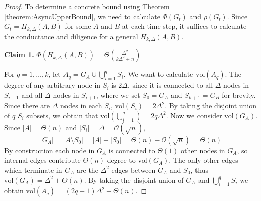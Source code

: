 \begin{proof}
	To determine a concrete bound using Theorem \ref{theorem:AsyncUpperBound}, we need to calculate $\Phi(G_t)$ and $\rho(G_t)$. Since $G_t = H_{k, \Delta}(A, B)$ for some $A$ and $B$ at each time step, it suffices to calculate the conductance and diligence for a general $H_{k, \Delta}(A, B)$.

	\textbf{Claim 1.} $\Phi(H_{k, \Delta}(A, B)) = \Theta\left(\frac{\Delta^2}{k\Delta^2 +n }\right)$

	For $q = 1, \dots, k$, let $A_q = G_A \cup \bigcup_{i=1}^q  S_i$. We want to calculate $\text{vol}(A_q)$. The degree of any arbitrary node in $S_i$ is $2\Delta$, since it is connected to all $\Delta$ nodes in $S_{i-1}$ and all $\Delta$ nodes in $S_{i+1}$, where we set $S_0 = G_A$ and $S_{k+1} = G_B$ for brevity. Since there are $\Delta$ nodes in each $S_i$, $\text{vol}(S_i) = 2\Delta^2$. By taking the disjoint union of $q$ $S_i$ subsets, we obtain that $\text{vol}(\bigcup_{i=1}^q) = 2q\Delta^2$. Now we consider $\text{vol}(G_A)$. Since $|A| = \Theta(n)$ and $|S_i| = \Delta = \mathcal{O}(\sqrt{n})$, 
	$$
		|G_A| = |A \setminus S_0| = |A| - |S_0| = \Theta(n) - \mathcal{O}(\sqrt{n}) = \Theta(n)
	$$
	By construction each node in $G_A$ is connected to $\Theta(1)$
	other nodes in $G_A$, so internal edges contribute $\Theta(n)$ degree to $\text{vol}(G_A)$. The only other edges which terminate in $G_A$ are the $\Delta^2$ edges between $G_A$ and $S_0$, thus $\text{vol}(G_A) = \Delta^2 + \Theta(n)$. By taking the disjoint union of $G_A$ and $\bigcup_{i=1}^q S_i$ we obtain $\text{vol}(A_q) = (2q + 1)\Delta^2 + \Theta(n)$. 
	

\end{proof}
